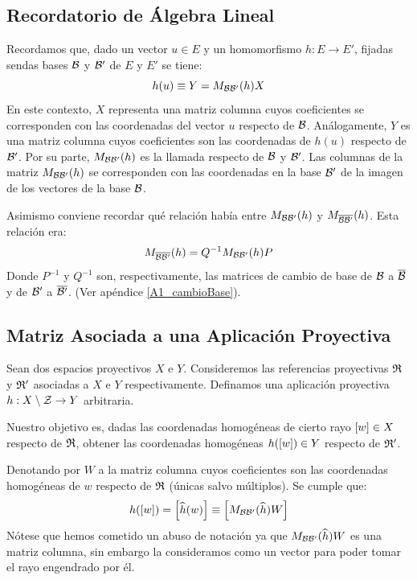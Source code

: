 \subsection{Recordatorio de Álgebra Lineal} 

Recordamos que, dado un vector $u\in E$ y un homomorfismo $h:E\to E'$, fijadas sendas bases $\mathcal{B}$ y $\mathcal{B}'$ de $E$ y $E'$ se tiene:
\begin{equation}
	\label{C4_eq_formulaLineales}
	h(u)\equiv Y=M_{\mathcal{B}\mathcal{B}'}(h)X
\end{equation}
En este contexto, $X$ representa una matriz columna cuyos coeficientes se corresponden con las coordenadas del vector $u$ respecto de $\mathcal{B}$. Análogamente, $Y$ es una matriz columna cuyos coeficientes son las coordenadas de $h(u)$ respecto de $\mathcal{B}'$. Por su parte, $M_{\mathcal{B}\mathcal{B}'}(h)$ es la llamada  respecto de $\mathcal{B}$ y $\mathcal{B}'$. Las columnas de la matriz $M_{\mathcal{B}\mathcal{B}'}(h)$ se corresponden con las coordenadas en la base $\mathcal{B}'$ de la imagen de los vectores de la base $\mathcal{B}$. 

Asimismo conviene recordar qué relación había entre $M_{\mathcal{B}\mathcal{B}'}(h)$ y $M_{\overline{\mathcal{B}}\overline{\mathcal{B}'}}(h)$. Esta relación era:
\begin{equation}
	M_{\overline{\mathcal{B}}\overline{\mathcal{B}'}}(h)=Q^{-1}M_{\mathcal{B}\mathcal{B}'}(h)P
\end{equation}
Donde $P^{-1}$ y $Q^{-1}$ son, respectivamente, las matrices de cambio de base de $\mathcal{B}$ a $\overline{\mathcal{B}}$ y de $\mathcal{B}'$ a $\overline{\mathcal{B}'}$. (Ver apéndice \ref{A1_cambioBase}).
\subsection{Matriz Asociada a una Aplicación Proyectiva}
Sean dos espacios proyectivos $X$ e $Y$. Consideremos las referencias proyectivas $\mathfrak{R}$ y $\mathfrak{R}'$ asociadas a $X$ e $Y$ respectivamente. Definamos una aplicación proyectiva $h:X\setminus \mathcal{Z}\to Y$ arbitraria.

Nuestro objetivo es, dadas las coordenadas homogéneas de cierto rayo $\left [ w \right ]\in X$ respecto de $\mathfrak{R}$, obtener las coordenadas homogéneas $h(\left [ w \right ])\in Y$ respecto de $\mathfrak{R}'$.

Denotando por $W$ a la matriz columna cuyos coeficientes son las coordenadas homogéneas de $w$ respecto de $\mathfrak{R}$ (únicas salvo múltiplos). Se cumple que:
\begin{equation}
	h(\left [ w \right ])=\left [ \widehat{h}(w) \right ]\equiv\left [ M_{\mathcal{B}\mathcal{B}'}(\widehat{h})W \right ]
\end{equation}
Nótese que hemos cometido un abuso de notación ya que $M_{\mathcal{B}\mathcal{B}'}(\widehat{h})W$ es una matriz columna, sin embargo la consideramos como un vector para poder tomar el rayo engendrado por él.

